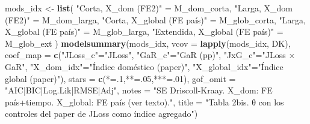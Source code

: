 \documentclass[
]{article}
\newenvironment{Shaded}{\begin{snugshade}}{\end{snugshade}}
\newcommand{\AttributeTok}[1]{\textcolor[rgb]{0.13,0.29,0.53}{#1}}
\newcommand{\DecValTok}[1]{\textcolor[rgb]{0.00,0.00,0.81}{#1}}
\newcommand{\FunctionTok}[1]{\textcolor[rgb]{0.13,0.29,0.53}{\textbf{#1}}}
\newcommand{\NormalTok}[1]{#1}
\newcommand{\OtherTok}[1]{\textcolor[rgb]{0.56,0.35,0.01}{#1}}
\newcommand{\StringTok}[1]{\textcolor[rgb]{0.31,0.60,0.02}{#1}}
\begin{document}
\begin{Shaded}
\begin{Highlighting}[]
\NormalTok{mods\_idx }\OtherTok{\textless{}{-}} \FunctionTok{list}\NormalTok{(}
  \StringTok{"Corta, X\_dom (FE2)"}       \OtherTok{=}\NormalTok{ M\_dom\_corta,}
  \StringTok{"Larga, X\_dom (FE2)"}       \OtherTok{=}\NormalTok{ M\_dom\_larga,}
  \StringTok{"Corta, X\_global (FE país)"}  \OtherTok{=}\NormalTok{ M\_glob\_corta,}
  \StringTok{"Larga, X\_global (FE país)"}  \OtherTok{=}\NormalTok{ M\_glob\_larga,}
  \StringTok{"Extendida, X\_global (FE país)"} \OtherTok{=}\NormalTok{ M\_glob\_ext}
\NormalTok{)}
\FunctionTok{modelsummary}\NormalTok{(mods\_idx, }\AttributeTok{vcov =} \FunctionTok{lapply}\NormalTok{(mods\_idx, DK),}
  \AttributeTok{coef\_map =} \FunctionTok{c}\NormalTok{(}\StringTok{"JLoss\_c"}\OtherTok{=}\StringTok{"JLoss"}\NormalTok{, }\StringTok{"GaR\_c"}\OtherTok{=}\StringTok{"GaR (pp)"}\NormalTok{, }\StringTok{"JxG\_c"}\OtherTok{=}\StringTok{"JLoss × GaR"}\NormalTok{,}
               \StringTok{"X\_dom\_idx"}\OtherTok{=}\StringTok{"Índice doméstico (paper)"}\NormalTok{, }\StringTok{"X\_global\_idx"}\OtherTok{=}\StringTok{"Índice global (paper)"}\NormalTok{),}
  \AttributeTok{stars =} \FunctionTok{c}\NormalTok{(}\StringTok{\textquotesingle{}*\textquotesingle{}}\OtherTok{=}\NormalTok{.}\DecValTok{1}\NormalTok{,}\StringTok{\textquotesingle{}**\textquotesingle{}}\OtherTok{=}\NormalTok{.}\DecValTok{05}\NormalTok{,}\StringTok{\textquotesingle{}***\textquotesingle{}}\OtherTok{=}\NormalTok{.}\DecValTok{01}\NormalTok{), }\AttributeTok{gof\_omit =} \StringTok{"AIC|BIC|Log.Lik|RMSE|Adj"}\NormalTok{,}
  \AttributeTok{notes =} \StringTok{"SE Driscoll{-}Kraay. X\_dom: FE país+tiempo. X\_global: FE país (ver texto)."}\NormalTok{,}
  \AttributeTok{title =} \StringTok{"Tabla 2bis. θ con los controles del paper de JLoss como índice agregado"}\NormalTok{)}
\end{Highlighting}
\end{Shaded}
\end{document}
